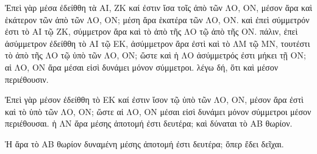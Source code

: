 \begin{Parallel}{}{}
{{\greekfont Ἐπεὶ γὰρ μέσα ἐδείθθη τὰ ΑΙ, ΖΚ καί ἐστιν ἴσα τοῖς ἀπὸ
τῶν ΛΟ, ΟΝ, μέσον ἄρα καὶ ἑκάτερον τῶν ἀπὸ τῶν ΛΟ, ΟΝ;
μέση ἄρα ἑκατέρα τῶν ΛΟ, ΟΝ. καὶ ἐπεὶ σύμμετρόν ἐστι
τὸ ΑΙ τῷ ΖΚ, σύμμετρον ἄρα καὶ τὸ ἀπὸ τῆς ΛΟ τῷ ἀπὸ
τῆς ΟΝ. πάλιν, ἐπεὶ ἀσύμμετρον ἐδείθθη τὸ ΑΙ τῷ ΕΚ,
ἀσύμμετρον ἄρα ἐστὶ καὶ τὸ ΛΜ τῷ ΜΝ, τουτέστι τὸ
ἀπὸ τῆς ΛΟ τῷ ὑπὸ τῶν ΛΟ, ΟΝ; ὥστε καὶ ἡ ΛΟ
ἀσύμμετρός ἐστι μήκει τῇ ΟΝ; αἱ ΛΟ, ΟΝ ἄρα μέσαι
εἰσὶ δυνάμει μόνον σύμμετροι. λέγω δή, ὅτι καὶ μέσον περιέθουσιν.}

{\greekfont Ἐπεὶ γὰρ μέσον ἐδείθθη τὸ ΕΚ καί ἐστιν ἴσον τῷ ὑπὸ τῶν
ΛΟ, ΟΝ, μέσον ἄρα ἐστὶ καὶ τὸ ὑπὸ τῶν ΛΟ, ΟΝ; ὥστε αἱ
ΛΟ, ΟΝ μέσαι εἰσὶ δυνάμει μόνον σύμμετροι μέσον περιέθουσαι.
ἡ ΛΝ ἄρα μέσης ἀποτομή ἐστι δευτέρα; καὶ δύναται τὸ ΑΒ
θωρίον.}

{\greekfont Ἡ ἄρα τὸ ΑΒ θωρίον δυναμένη μέσης ἀποτομή ἐστι δευτέρα;
ὅπερ ἔδει δεῖχαι.}}

\end{Parallel}
